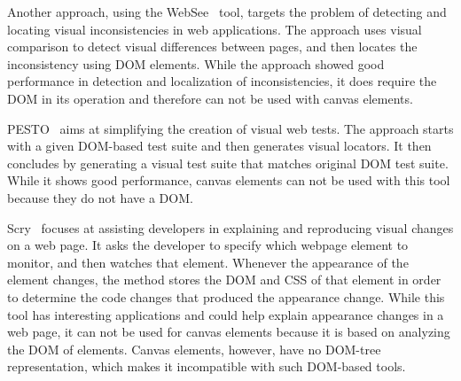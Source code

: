 Another approach, using the WebSee~\cite{mahajan16apsec} tool, targets the problem of detecting and locating visual inconsistencies in web applications. The approach uses visual comparison to detect visual differences between pages, and then locates the inconsistency using DOM elements. While the approach showed good performance in detection and localization of inconsistencies, it does require the DOM in its operation and therefore can not be used with canvas elements.

PESTO~\cite{leotta2015automated} aims at simplifying the creation of visual web tests. The approach starts with a given DOM-based test suite and then generates visual locators. It then concludes by generating a visual test suite that matches original DOM test suite. While it shows good performance, canvas elements can not be used with this tool because they do not have a DOM.

Scry~\cite{burg2015explaining} focuses at assisting developers in explaining and reproducing visual changes on a web page. It asks the developer to specify which webpage element to monitor, and then watches that element. Whenever the appearance of the element changes, the method stores the DOM and CSS of that element in order to determine the code changes that produced the appearance change. While this tool has interesting applications and could help explain appearance changes in a web page, it can not be used for canvas elements because it is based on analyzing the DOM of elements. Canvas elements, however, have no DOM-tree representation, which makes it incompatible with such DOM-based tools.

